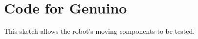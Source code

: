 \chapter{Code for Genuino}\label{code}\label{section \thechapter}

% 

\label{ino:test_routine}
This \gls{sketch} allows the robot's moving components to be tested.
\inputminted{cpp}{Code/test_routine.ino}
